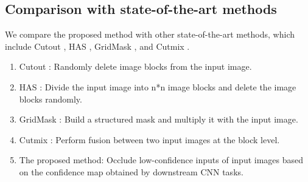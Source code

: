 \documentclass[sn-mathphys]{sn-jnl}%
\theoremstyle{thmstyleone}%
\theoremstyle{thmstyletwo}%
\theoremstyle{thmstylethree}%
\begin{document}
\subsection{Comparison with state-of-the-art methods}\label{sec:exp.3}
\label{sec:4.3}
We compare the proposed method with other state-of-the-art methods, which include Cutout \cite{devries2017improved}, HAS \cite{singh2017hide}, GridMask \cite{chen2020gridmask}, and Cutmix \cite{yun2019cutmix}. 
\begin{enumerate}[1)]
\item Cutout \cite{devries2017improved}: Randomly delete image blocks from the input image.
\item HAS \cite{singh2017hide}: Divide the input image into n*n image blocks and delete the image blocks randomly.
\item GridMask \cite{chen2020gridmask}: Build a structured mask and multiply it with the input image.
\item Cutmix \cite{yun2019cutmix}: Perform fusion between two input images at the block level.
\item The proposed method: Occlude low-confidence inputs of input images based on the confidence map obtained by downstream CNN tasks.
\end{enumerate}
\end{document}
